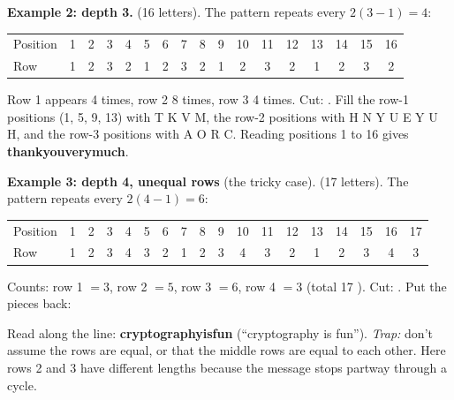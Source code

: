 \textbf{Example 2: depth 3.}  (16 letters). The pattern repeats every $2(3-1) = 4$:
\begin{center}\small\setlength{\tabcolsep}{4pt}
\begin{tabular}{@{}l*{16}{c}@{}}
\toprule
Position & 1&2&3&4&5&6&7&8&9&10&11&12&13&14&15&16\\
Row & 1&2&3&2&1&2&3&2&1&2&3&2&1&2&3&2\\
\bottomrule
\end{tabular}
\end{center}
Row 1 appears 4 times, row 2 8 times, row 3 4 times. Cut: .
Fill the row-1 positions (1, 5, 9, 13) with T K V M, the row-2 positions with H N Y U E Y U H, and the row-3 positions with A O R C. Reading positions 1 to 16 gives \textbf{thankyouverymuch}.

\textbf{Example 3: depth 4, unequal rows} (the tricky case).  (17 letters). The pattern repeats every $2(4-1) = 6$:
\begin{center}\small\setlength{\tabcolsep}{4pt}
\begin{tabular}{@{}l*{17}{c}@{}}
\toprule
Position & 1&2&3&4&5&6&7&8&9&10&11&12&13&14&15&16&17\\
Row & 1&2&3&4&3&2&1&2&3&4&3&2&1&2&3&4&3\\
\bottomrule
\end{tabular}
\end{center}
Counts: row 1 $= 3$, row 2 $= 5$, row 3 $= 6$, row 4 $= 3$ (total 17 \checkmark). Cut: . Put the pieces back:
\begin{center}
\end{center}
Read along the line: \textbf{cryptographyisfun} (``cryptography is fun'').
\emph{Trap:} don't assume the rows are equal, or that the middle rows are equal to each other. Here rows 2 and 3 have different lengths because the message stops partway through a cycle.

